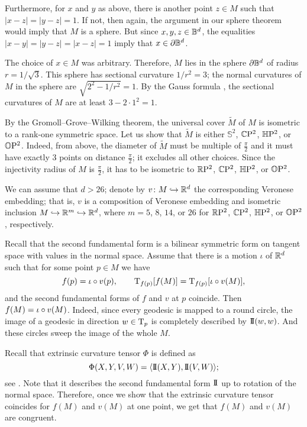 \documentclass[a4paper,10pt]{article}
\begin{document}
Furthermore, for $x$ and $y$ as above,
there is another point $z\in M$ such that $|x-z|=|y-z|=1$.
If not, then again, the argument in our sphere theorem would imply that $M$ is a sphere.
But since $x,y,z\in\mathbb{B}^d$,
the equalities $|x-y|=|y-z|=|x-z|=1$ imply that $x\in \partial \mathbb{B}^d$.

The choice of $x\in M$ was arbitrary.
Therefore, $M$ lies in the sphere $\partial \mathbb{B}^d$ of radius $r=1/\sqrt{3}$.
This sphere has sectional curvature $1/r^2=3$;
the normal curvatures of $M$ in the sphere are $\sqrt{2^2-1/r^2}=1$.
By the Gauss formula \cite[Lemma 5]{petrunin2024}, the sectional curvatures of $M$ are at least $3-2\cdot 1^2=1$.

By the Gromoll--Grove--Wilking theorem, the universal cover $\tilde M$ of $M$ is isometric to a rank-one symmetric space.
Let us show that $\tilde M$ is either $\mathbb{S}^2$, $\mathbb{C}\mathrm{P}^2$, $\mathbb{H}\mathrm{P}^2$, or $\mathbb{O}\mathrm{P}^2$.
Indeed, from above, the diameter of $\tilde M$ must be multiple of $\tfrac\pi2$ and it must have exactly 3 points on distance $\tfrac\pi2$; it excludes all other choices.
Since the injectivity radius of $M$ is $\tfrac\pi2$, 
it has to be isometric to $\mathbb{R}\mathrm{P}^2$, $\mathbb{C}\mathrm{P}^2$, $\mathbb{H}\mathrm{P}^2$, or $\mathbb{O}\mathrm{P}^2$.

We can assume that $d>26$;
denote by $v\colon M\hookrightarrow \mathbb{R}^d$ the corresponding Veronese embedding;
that is, $v$ is a composition of Veronese embedding and isometric inclusion $M\hookrightarrow \mathbb{R}^m\hookrightarrow \mathbb{R}^d$, where $m=5$, $8$, $14$, or $26$ for $\mathbb{R}\mathrm{P}^2$, $\mathbb{C}\mathrm{P}^2$, $\mathbb{H}\mathrm{P}^2$, or $\mathbb{O}\mathrm{P}^2$, respectively.

Recall that the second fundamental form is a bilinear symmetric form on tangent space with values in the normal space.
Assume that there is a motion $\iota$ of $\mathbb{R}^d$ such that for some point $p\in M$ we have 
\[f(p)=\iota\circ v(p),\qquad \T_{f(p)}[f(M)]\z=\T_{f(p)}[\iota\circ v(M)],\]
and the second fundamental forms of $f$ and $v$ at $p$ coincide.
Then $f(M)\z=\iota\circ v(M)$.
Indeed, since every geodesic is mapped to a round circle, the image of a geodesic in direction $w\in \mathrm{T}_p$ is completely described by $\mathrm{I}\!\mathrm{I}(w,w)$.
And these circles sweep the image of the whole $M$.

Recall that extrinsic curvature tensor $\Phi$ is defined as
\[\Phi(X,Y,V,W)=\langle \mathrm{I}\!\mathrm{I}(X,Y),\mathrm{I}\!\mathrm{I}(V,W)\rangle;\]
see \cite{petrunin2003}.
Note that it describes the second fundamental form $\mathrm{I}\!\mathrm{I}$ up to rotation of the normal space.
Therefore, once we show that the extrinsic curvature tensor coincides for $f(M)$ and $v(M)$ at one point,
we get that $f(M)$ and $v(M)$ are congruent.
\end{document}
